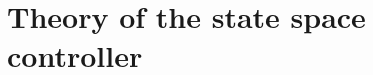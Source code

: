 \section{Theory of the state space controller}\label{chapter_THEORY}

\pagestyle{fancy}


\pagestyle{fancy}


\pagestyle{fancy}


\pagestyle{fancy}


\pagestyle{fancy}




